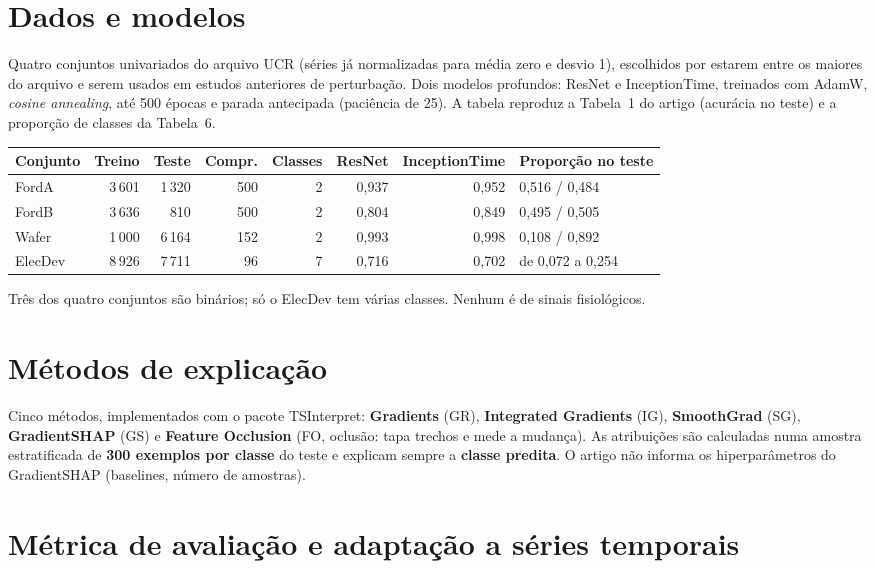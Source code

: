 \documentclass[11pt,a4paper]{article}
\begin{document}
\section{Dados e modelos}
Quatro conjuntos univariados do arquivo UCR (séries já normalizadas para média zero e desvio 1), escolhidos por estarem entre os maiores do arquivo e serem usados em estudos anteriores de perturbação. Dois modelos profundos: ResNet e InceptionTime, treinados com AdamW, \textit{cosine annealing}, até 500 épocas e parada antecipada (paciência de 25). A tabela reproduz a Tabela~1 do artigo (acurácia no teste) e a proporção de classes da Tabela~6.
\begin{center}\small
\begin{tabular}{lrrrrrrl}
\toprule
\textbf{Conjunto} & \textbf{Treino} & \textbf{Teste} & \textbf{Compr.} & \textbf{Classes} & \textbf{ResNet} & \textbf{InceptionTime} & \textbf{Proporção no teste} \\
\midrule
FordA   & 3\,601 & 1\,320 & 500 & 2 & 0,937 & 0,952 & 0,516 / 0,484 \\
FordB   & 3\,636 &    810 & 500 & 2 & 0,804 & 0,849 & 0,495 / 0,505 \\
Wafer   & 1\,000 & 6\,164 & 152 & 2 & 0,993 & 0,998 & 0,108 / 0,892 \\
ElecDev & 8\,926 & 7\,711 &  96 & 7 & 0,716 & 0,702 & de 0,072 a 0,254 \\
\bottomrule
\end{tabular}
\end{center}
Três dos quatro conjuntos são binários; só o ElecDev tem várias classes. Nenhum é de sinais fisiológicos.

\section{Métodos de explicação}
Cinco métodos, implementados com o pacote TSInterpret: \textbf{Gradients} (GR), \textbf{Integrated Gradients} (IG), \textbf{SmoothGrad} (SG), \textbf{GradientSHAP} (GS) e \textbf{Feature Occlusion} (FO, oclusão: tapa trechos e mede a mudança). As atribuições são calculadas numa amostra estratificada de \textbf{300 exemplos por classe} do teste e explicam sempre a \textbf{classe predita}. O artigo não informa os hiperparâmetros do GradientSHAP (baselines, número de amostras).

\section{Métrica de avaliação e adaptação a séries temporais}
\end{document}
